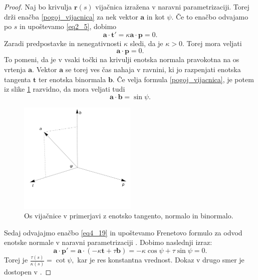 \documentclass[12pt,a4paper,twoside]{article}
\theoremstyle{definition} %
\theoremstyle{plain} %
\theoremstyle{primerstyle}
\numberwithin{equation}{section}  %
\newcommand{\tV}{\mathbf{t}}
\newcommand{\aV}{\mathbf{a}}
\newcommand{\bV}{\mathbf{b}}
\newcommand{\pV}{\mathbf{p}}
\newcommand{\rV}{\mathbf{r}}
\begin{document}
\begin{proof}
	Naj bo krivulja $\rV(s)$ vijačnica izražena v naravni parametrizaciji. Torej drži enačba \eqref{pogoj_vijacnica} za nek vektor $\aV$ in kot $\psi.$ Če to enačbo odvajamo po $s$ in upoštevamo \eqref{eq2_5}, dobimo
	\begin{equation}
		\aV \cdot \tV'=\kappa \aV \cdot \pV=0.
	\end{equation}
	Zaradi predpostavke in nenegativnosti $\kappa$ sledi, da je $\kappa > 0.$ Torej mora veljati
	\begin{equation}
	\label{eq4_19}
	\aV \cdot \pV=0.
	\end{equation}
	To pomeni, da je v vsaki točki na krivulji enotska normala pravokotna na os vrtenja $\aV.$ Vektor $\aV$ se torej ves čas nahaja v ravnini, ki jo razpenjati enotska tangenta $\tV$ ter enotska binormala $\bV.$ Če velja formula \eqref{pogoj_vijacnica}, je potem iz slike \ref{fig:lancret} razvidno, da mora veljati tudi
	\begin{equation}
		\aV \cdot \bV=\sin \psi.
	\end{equation}
	\begin{figure}[h!]
	  \centering
	  \includegraphics[width=0.5\textwidth]{images/lancret.pdf}
	  \caption[Os vijačnice v primerjavi z enotsko tangento, normalo in binormalo.]{Os vijačnice v primerjavi z enotsko tangento, normalo in binormalo.}
	  \label{fig:lancret}
	\end{figure}
	Sedaj odvajajmo enačbo \eqref{eq4_19} in upoštevamo Frenetovo formulo za odvod enotske normale v naravni parametrizaciji \cite{kreyszig2019differential}. Dobimo naslednji izraz:
	\begin{equation}
		\aV \cdot \pV'=\aV \cdot (-\kappa \tV+\tau \bV)=-\kappa \cos \psi + \tau \sin \psi=0.
	\end{equation}
	Torej je $\frac{\tau(s)}{\kappa(s)}=\cot \psi,$ kar je res konstantna vrednost. Dokaz v drugo smer je dostopen v \cite{kreyszig2019differential}.
\end{proof}
\end{document}

